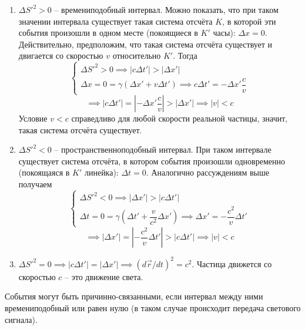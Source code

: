 \documentclass{article}
\begin{document}
\begin{enumerate}
    \item $\Delta S'^2 > 0$ -- времениподобный интервал. Можно показать, что при таком значении интервала существует такая система отсчёта $K$, в которой эти события произошли в одном месте (покоящиеся в $K'$ часы): $\Delta x=0$. Действительно, предположим, что такая система отсчёта существует и двигается со скоростью $v$ относительно $K'$. Тогда
    \begin{equation*}
        \begin{cases}
        \Delta S'^2 > 0 \implies |c\Delta t'| > |\Delta x'|\\
        \Delta x=0=\gamma\left(\Delta x'+v\Delta t'\right) \implies c\Delta t'=-\Delta x'\dfrac{c}{v}
        \end{cases}
    \end{equation*}
    \begin{equation*}
        \implies |c\Delta t'|=|-\Delta x'\frac{c}{v}|>|\Delta x'| \implies |v|<c
    \end{equation*}
    Условие $v<c$ справедливо для любой скорости реальной частицы, значит, такая система отсчёта существует.
    \item $\Delta S'^2 < 0$ -- пространственноподобный интервал. При таком интервале существует система отсчёта, в котором события произошли одновременно (покоящаяся в $K'$ линейка): $\Delta t=0$. Аналогично рассуждениям выше получаем
    \begin{equation*}
        \begin{cases}
        \Delta S'^2 < 0 \implies |\Delta x'|>|c\Delta t'|\\
        \Delta t=0=\gamma\left(\Delta t'+\dfrac{v}{c^2}\Delta x'\right) \implies \Delta x'=-\dfrac{c^2}{v}\Delta t'
        \end{cases}
    \end{equation*}
    \begin{equation*}
        \implies |\Delta x'|=|-\frac{c^2}{v}\Delta t'|>|c\Delta t'| \implies |v|<c
    \end{equation*}
    \item $\Delta S'^2 = 0 \implies |c\Delta t'|=|\Delta x'| \implies \left(d\vec{r}/dt\right)^2=c^2$. Частица движется со скоростью $c$ -- это движение света.
\end{enumerate}

События могут быть причинно-связанными, если интервал между ними времениподобный или равен нулю (в таком случае происходит передача светового сигнала).
\end{document}
